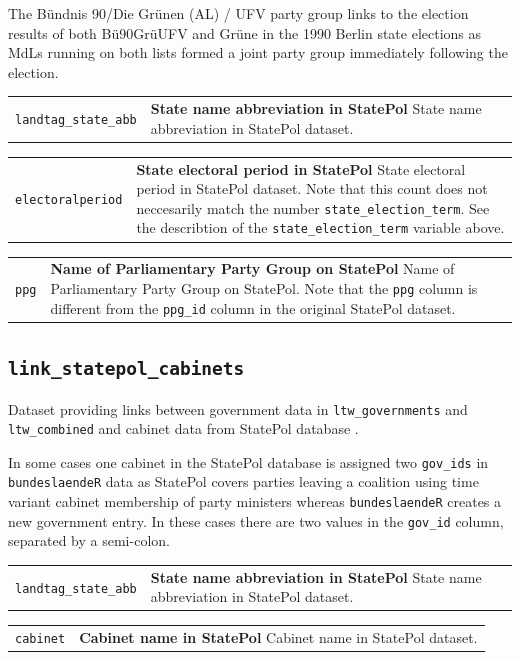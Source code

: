 \documentclass[
]{scrartcl}
\begin{document}
The Bündnis 90/Die Grünen (AL) / UFV party group links to the election
results of both Bü90GrüUFV and Grüne in the 1990 Berlin state elections
as MdLs running on both lists formed a joint party group immediately
following the election.

\begin{longtable}{p{3.2cm}| p{11cm}}
\texttt{landtag\_state\_abb} &\textbf{State name abbreviation in StatePol}\newline 
State name abbreviation in StatePol dataset.
\end{longtable}

\begin{longtable}{p{3.2cm}| p{11cm}}
\texttt{electoralperiod} &\textbf{State electoral period in StatePol}\newline 
State electoral period in StatePol dataset. Note that this count does not neccesarily match the number \texttt{state\_election\_term}. See the describtion of the \texttt{state\_election\_term} variable above.
\end{longtable}

\begin{longtable}{p{3.2cm}| p{11cm}}
\texttt{ppg} &\textbf{Name of Parliamentary Party Group on StatePol}\newline 
Name of Parliamentary Party Group on StatePol. Note that the \texttt{ppg} column is different from the \texttt{ppg\_id} column in the original StatePol dataset.
\end{longtable}

\newpage

\subsection{\texorpdfstring{\texttt{link\_statepol\_cabinets}}{link\_statepol\_cabinets}}\label{link_statepol_cabinets}

Dataset providing links between government data in
\texttt{ltw\_governments} and \texttt{ltw\_combined} and cabinet data
from StatePol database
\parencite{kochStatePolDatenbankMitgliedern2024a}.

In some cases one cabinet in the StatePol database is assigned two
\texttt{gov\_ids} in \texttt{bundeslaendeR} data as StatePol covers
parties leaving a coalition using time variant cabinet membership of
party ministers whereas \texttt{bundeslaendeR} creates a new government
entry. In these cases there are two values in the \texttt{gov\_id}
column, separated by a semi-colon.

\begin{longtable}{p{3.2cm}| p{11cm}}
\texttt{landtag\_state\_abb} &\textbf{State name abbreviation in StatePol}\newline 
State name abbreviation in StatePol dataset.
\end{longtable}

\begin{longtable}{p{3.2cm}| p{11cm}}
\texttt{cabinet} &\textbf{Cabinet name in StatePol}\newline 
Cabinet name in StatePol dataset.
\end{longtable}

\newpage

\printbibliography[title=References]
\end{document}
